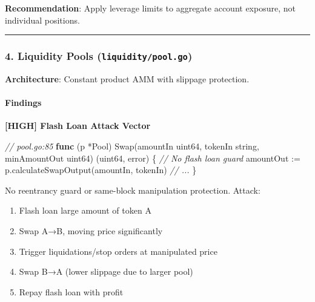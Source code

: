 \documentclass[
]{article}
\newenvironment{Shaded}{}{}
\newcommand{\CommentTok}[1]{\textcolor[rgb]{0.38,0.63,0.69}{\textit{#1}}}
\newcommand{\DataTypeTok}[1]{\textcolor[rgb]{0.56,0.13,0.00}{#1}}
\newcommand{\KeywordTok}[1]{\textcolor[rgb]{0.00,0.44,0.13}{\textbf{#1}}}
\newcommand{\NormalTok}[1]{#1}
\newcommand{\OperatorTok}[1]{\textcolor[rgb]{0.40,0.40,0.40}{#1}}
\providecommand{\tightlist}{%
  \setlength{\itemsep}{0pt}\setlength{\parskip}{0pt}}
\begin{document}
\textbf{Recommendation}: Apply leverage limits to aggregate account
exposure, not individual positions.

\begin{center}\rule{0.5\linewidth}{0.5pt}\end{center}

\subsubsection{\texorpdfstring{4. Liquidity Pools
(\texttt{liquidity/pool.go})}{4. Liquidity Pools (liquidity/pool.go)}}\label{4-liquidity-pools-liquiditypoolgo}

\textbf{Architecture}: Constant product AMM with slippage protection.

\paragraph{Findings}\label{findings-3}

\textbf{{[}HIGH{]} Flash Loan Attack Vector}

\begin{Shaded}
\begin{Highlighting}[]
\CommentTok{// pool.go:85}
\KeywordTok{func} \OperatorTok{(}\NormalTok{p }\OperatorTok{*}\NormalTok{Pool}\OperatorTok{)}\NormalTok{ Swap}\OperatorTok{(}\NormalTok{amountIn }\DataTypeTok{uint64}\OperatorTok{,}\NormalTok{ tokenIn }\DataTypeTok{string}\OperatorTok{,}\NormalTok{ minAmountOut }\DataTypeTok{uint64}\OperatorTok{)} \OperatorTok{(}\DataTypeTok{uint64}\OperatorTok{,} \DataTypeTok{error}\OperatorTok{)} \OperatorTok{\{}
    \CommentTok{// No flash loan guard}
\NormalTok{    amountOut }\OperatorTok{:=}\NormalTok{ p}\OperatorTok{.}\NormalTok{calculateSwapOutput}\OperatorTok{(}\NormalTok{amountIn}\OperatorTok{,}\NormalTok{ tokenIn}\OperatorTok{)}
    \CommentTok{// ...}
\OperatorTok{\}}
\end{Highlighting}
\end{Shaded}

No reentrancy guard or same-block manipulation protection. Attack:

\begin{enumerate}
\def\labelenumi{\arabic{enumi}.}
\tightlist
\item
  Flash loan large amount of token A
\item
  Swap A→B, moving price significantly
\item
  Trigger liquidations/stop orders at manipulated price
\item
  Swap B→A (lower slippage due to larger pool)
\item
  Repay flash loan with profit
\end{enumerate}
\end{document}
